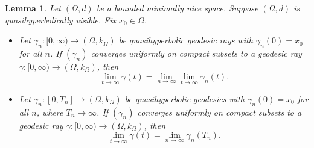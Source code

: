 \documentclass[10pt,a4paper]{amsart}
\newtheorem{lem}{Lemma}
\begin{document}
\begin{lem}\label{continuous}
	Let $(\Omega,d)$ be a bounded minimally nice space. Suppose $(\Omega,d)$ is quasihyperbolically visible. Fix $x_0\in \Omega$.
	\begin{itemize}
		\item[(i)] Let $\gamma_n:[0,\infty)\to (\Omega,k_{\Omega})$ be quasihyperbolic geodesic rays with $\gamma_n(0)=x_0$ for all $n$.
		If $(\gamma_n)$ converges uniformly on compact subsets to a geodesic ray $\gamma:[0,\infty)\to (\Omega,k_{\Omega})$, then
		\[
		\lim_{t\to \infty}\gamma(t)=\lim_{n\to \infty}\lim_{t\to\infty}\gamma_n(t).
		\]
		\item[(ii)] Let $\gamma_n:[0,T_n]\to (\Omega,k_{\Omega})$ be quasihyperbolic geodesics with $\gamma_n(0)=x_0$ for all $n$, where $T_n\to\infty$.
		If $(\gamma_n)$ converges uniformly on compact subsets to a geodesic ray $\gamma:[0,\infty)\to (\Omega,k_{\Omega})$, then
		\[
		\lim_{t\to \infty}\gamma(t)=\lim_{n\to \infty}\gamma_n(T_n).
		\]
	\end{itemize}
\end{lem}
\end{document}
